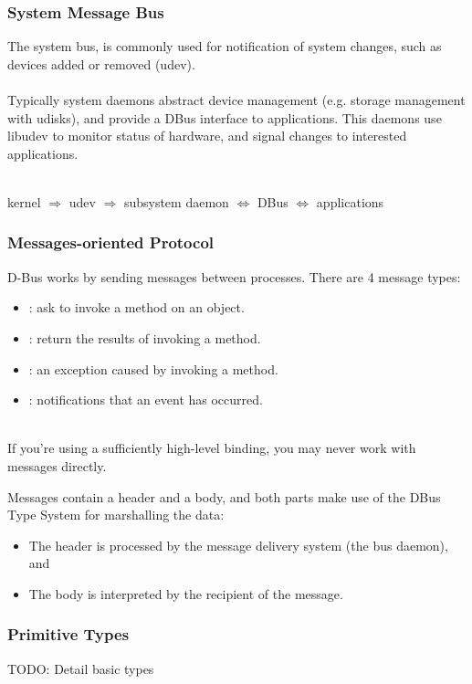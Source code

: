 \documentclass[xcolor=dvipsnames,compress]{beamer}
\begin{document}
\begin{frame}
    \frametitle{System Message Bus}
    The system bus, is commonly used for notification of system changes, such as devices added or removed (udev).\\~\\
    Typically system daemons abstract device management (e.g. storage management with udisks), and provide a DBus interface to applications.
    This daemons use libudev to monitor status of hardware, and signal changes to interested applications.\\~\\
    \begin{block}{}
        kernel $\Rightarrow$  udev $\Rightarrow$ subsystem daemon $\Leftrightarrow$ DBus $\Leftrightarrow$ applications
    \end{block}
\end{frame}

\begin{frame}
\frametitle{Messages-oriented Protocol}
    D-Bus works by sending messages between processes. There are 4 message types: 
    \begin{itemize}
    \item {}: ask to invoke a method on an object.
    \item {}: return the results of invoking a method.
    \item {}: an exception caused by invoking a method.
    \item {}: notifications that an event has occurred.\\~\\
    \end{itemize}
    If you're using a sufficiently high-level binding, you may never work with messages directly.
\end{frame}

\begin{frame}
    Messages contain a header and a body, and both parts make use of the DBus Type System for marshalling the data:
    \begin{itemize}
    \item The header is processed by the message delivery system (the bus daemon), and 
    \item The body is interpreted by the recipient of the message.
    \end{itemize}
\end{frame}

\begin{frame}
    \frametitle{Primitive Types}
    TODO: Detail basic types
\end{frame}
\end{document}
